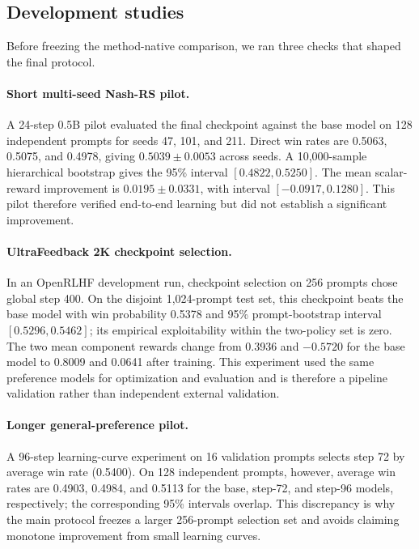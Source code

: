 \subsection{Development studies}
\label{sec:development-studies}

Before freezing the method-native comparison, we ran three checks that shaped
the final protocol.

\paragraph{Short multi-seed Nash-RS pilot.}
A 24-step 0.5B pilot evaluated the final checkpoint against the base model on
128 independent prompts for seeds 47, 101, and 211.  Direct win rates are
0.5063, 0.5075, and 0.4978, giving $0.5039\pm0.0053$ across seeds.  A
10,000-sample hierarchical bootstrap gives the 95\% interval
$[0.4822,0.5250]$.  The mean scalar-reward improvement is
$0.0195\pm0.0331$, with interval $[-0.0917,0.1280]$.  This pilot therefore
verified end-to-end learning but did not establish a significant improvement.

\paragraph{UltraFeedback 2K checkpoint selection.}
In an OpenRLHF development run, checkpoint selection on 256 prompts chose
global step 400.  On the disjoint 1,024-prompt test set, this checkpoint beats
the base model with win probability 0.5378 and 95\% prompt-bootstrap interval
$[0.5296,0.5462]$; its empirical exploitability within the two-policy set is
zero.  The two mean component rewards change from 0.3936 and $-0.5720$ for the
base model to 0.8009 and 0.0641 after training.  This experiment used the same
preference models for optimization and evaluation and is therefore a pipeline
validation rather than independent external validation.

\paragraph{Longer general-preference pilot.}
A 96-step learning-curve experiment on 16 validation prompts selects step 72
by average win rate (0.5400).  On 128 independent prompts, however, average win
rates are 0.4903, 0.4984, and 0.5113 for the base, step-72, and step-96 models,
respectively; the corresponding 95\% intervals overlap.  This discrepancy is
why the main protocol freezes a larger 256-prompt selection set and avoids
claiming monotone improvement from small learning curves.

